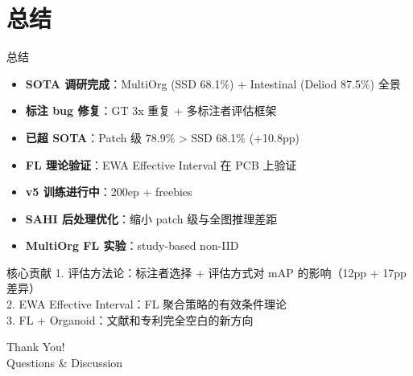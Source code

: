 \documentclass[aspectratio=169, 11pt]{beamer}
\begin{document}
\section{总结}

\begin{frame}{总结}
  \begin{itemize}
    \item[\checkmark] \textbf{SOTA 调研完成}：MultiOrg (SSD 68.1\%) + Intestinal (Deliod 87.5\%) 全景
    \item[\checkmark] \textbf{标注 bug 修复}：GT 3x 重复 + 多标注者评估框架
    \item[\checkmark] \textbf{已超 SOTA}：Patch 级 78.9\% > SSD 68.1\% (+10.8pp)
    \item[\checkmark] \textbf{FL 理论验证}：EWA Effective Interval 在 PCB 上验证
    \item[$\circ$] \textbf{v5 训练进行中}：200ep + freebies
    \item[$\circ$] \textbf{SAHI 后处理优化}：缩小 patch 级与全图推理差距
    \item[$\circ$] \textbf{MultiOrg FL 实验}：study-based non-IID
  \end{itemize}
  \vspace{0.5em}
  \begin{block}{核心贡献}
    1. 评估方法论：标注者选择 + 评估方式对 mAP 的影响（12pp + 17pp 差异）\\
    2. EWA Effective Interval：FL 聚合策略的有效条件理论\\
    3. FL + Organoid：文献和专利完全空白的新方向
  \end{block}
\end{frame}

\begin{frame}
  \centering\Large Thank You!\\[0.8em]
  \normalsize Questions \& Discussion
\end{frame}
\end{document}
